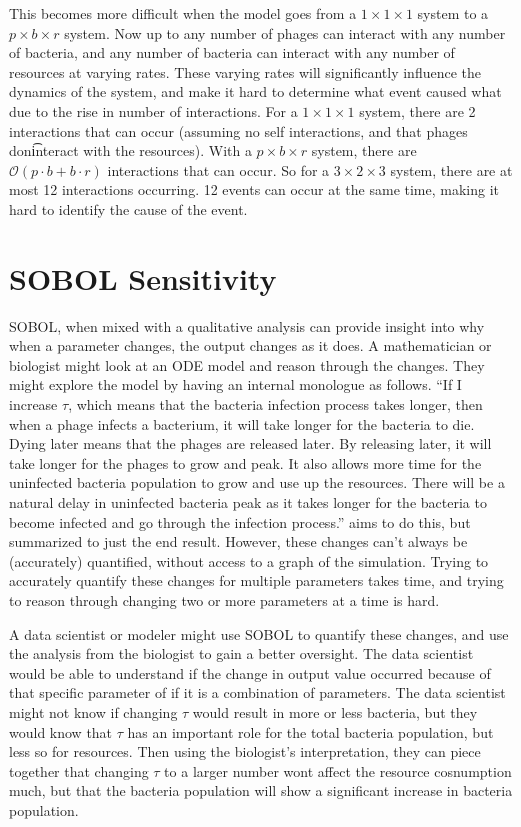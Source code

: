 This becomes more difficult when the model goes from a $1\times1\times1$ system to a $p\times b \times r$ system. 
Now up to any number of phages can interact with any number of bacteria, and any number of bacteria can interact with any number of resources at varying rates. 
These varying rates will significantly influence the dynamics of the system, and make it hard to determine what event caused what due to the rise in number of interactions.
For a $1\times1\times1$ system, there are 2 interactions that can occur (assuming no self interactions, and that phages don\t interact with the resources). 
With a $p\times b\times r$ system, there are $\mathcal{O}(p\cdot b + b\cdot r)$ interactions that can occur. 
So for a $3\times2\times3$ system, there are at most 12 interactions occurring. 
12 events can occur at the same time, making it hard to identify the cause of the event. 

\section{SOBOL Sensitivity}
SOBOL, when mixed with a qualitative analysis can provide insight into why when a parameter changes, the output changes as it does. 
A mathematician or biologist might look at an ODE model and reason through the changes. 
They might explore the model by having an internal monologue as follows. 
“If I increase $\tau$, which means that the bacteria infection process takes longer, then when a phage infects a bacterium, it will take longer for the bacteria to die. 
Dying later means that the phages are released later. 
By releasing later, it will take longer for the phages to grow and peak. 
It also allows more time for the uninfected bacteria population to grow and use up the resources. 
There will be a natural delay in uninfected bacteria peak as it takes longer for the bacteria to become infected and go through the infection process.”
 aims to do this, but summarized to just the end result. 
However, these changes can't always be (accurately) quantified, without access to a graph of the simulation. 
Trying to accurately quantify these changes for multiple parameters takes time, and trying to reason through changing two or more parameters at a time is hard. 

A data scientist or modeler might use SOBOL to quantify these changes, and use the analysis from the biologist to gain a better oversight. 
The data scientist would be able to understand if the change in output value occurred because of that specific parameter of if it is a combination of parameters. 
The data scientist might not know if changing $\tau$ would result in more or less bacteria, but they would know that $\tau$ has an important role for the total bacteria population, but less so for resources. 
Then using the biologist's interpretation, they can piece together that changing $\tau$ to a larger number wont affect the resource cosnumption much, but that the bacteria population will show a significant increase in bacteria population. 

